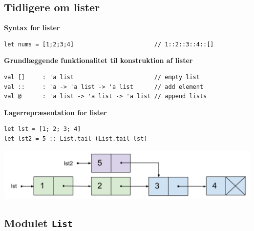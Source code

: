 \documentclass[rgb]{beamer}
\begin{document}
\popmaketitleframe

\subsection{Tidligere om lister}

\begin{frame}[fragile]
\begin{footnotesize}

\textbf{Syntax for lister}

\begin{lstlisting}[numbers=none,frame=none]
let nums = [1;2;3;4]                       // 1::2::3::4::[]
\end{lstlisting}

\textbf{Grundlæggende funktionalitet til konstruktion af lister}
\begin{lstlisting}[numbers=none,frame=none]
val []     : 'a list                       // empty list
val ::     : 'a -> 'a list -> 'a list      // add element
val @      : 'a list -> 'a list -> 'a list // append lists
\end{lstlisting}

\textbf{Lagerrepræsentation for lister}

\begin{lstlisting}[numbers=none,frame=none]
let lst = [1; 2; 3; 4]
let lst2 = 5 :: List.tail (List.tail lst)
\end{lstlisting}

\includegraphics[width=.9\textwidth]{list1234.png}

\end{footnotesize}
\end{frame}

\subsection{Modulet \lstinline{List}}
\end{document}
